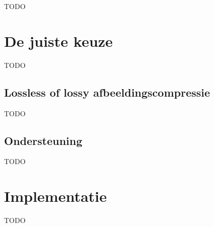 TODO

\section{De juiste keuze}
\label{sec:afbeeldingscompressie-keuze}

TODO

\subsection{Lossless of lossy afbeeldingscompressie}
\label{sec:afbeeldingscompressie-lossless-of-lossy}

TODO

\subsection{Ondersteuning}
\label{sec:afbeeldingscompressie-ondersteuning}

TODO

\section{Implementatie}
\label{sec:afbeeldingscompressie-implementatie}

TODO
